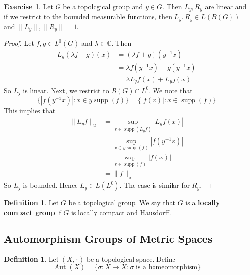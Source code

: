 \documentclass[12pt]{amsart}
\theoremstyle{definition}
\newtheorem{defn}[definition]{Definition}
\newtheorem{ex}[definition]{Exercise}
\newcommand{\lam}{\lambda}
\newcommand{\sig}{\sigma}
\newcommand{\C}{\mathbb{C}}
\newcommand{\tbf}[1]{\textbf{#1}}
\DeclareMathOperator{\supp}{supp}
\DeclareMathOperator{\Aut}{Aut}
\DeclareMathOperator*{\0}{\mbf{0}}
\DeclareMathOperator*{\1}{\mbf{1}}
\newcommand{\lex}[1]{\label{ex:#1}}
\newcommand{\ld}[1]{\label{defn:#1}}
\begin{document}
	\begin{ex} \lex{00000} 
		Let $G$ be a topological group and $y \in G$. Then $L_y, R_y$ are linear and if we restrict to the bounded measurable functions, then  $L_y, R_y \in L(B(G))$ and $\|L_y\|, \|R_y\| = 1$. 
	\end{ex}
	
	\begin{proof}
		Let $f, g \in L^0(G)$ and $\lam \in \C$. Then 
		\begin{align*}
			L_y(\lam f+g)(x)
			& = (\lam f+g)(y^{-1}x) \\
			& = \lam f(y^{-1}x) + g(y^{-1}x) \\
			& = \lam L_yf(x) + L_yg(x)
		\end{align*}
		So $L_y$ is linear. Next, we restrict to $B(G) \cap L^0$. We note that $$\{|f(y^{-1}x)|: x \in y\supp(f)\} = \{|f(x)|: x \in \supp(f)\}$$ This implies that 
		\begin{align*}
			\|L_yf \|_u 
			& = \sup_{x \in \supp(L_yf)} |L_yf(x)| \\
			& = \sup_{x \in y\supp(f)} |f(y^{-1}x)| \\
			& = \sup_{x \in \supp(f)} |f(x)| \\ 
			& = \|f\|_u
		\end{align*} 
		So $L_y$ is bounded. Hence $L_y \in L(L^0)$. The case is similar for $R_y$.
	\end{proof}
	
	\begin{defn} \ld{00000} 
		Let $G$ be a topological group. We say that $G$ is a \tbf{locally compact group} if $G$ is locally compact and Hausdorff.
	\end{defn}
	
	
	
	
	
	
	
	
	
	
	
	
	
	
	
	
	
	
	
	
	
	
	
	
	\newpage
	\subsection{Automorphism Groups of Metric Spaces}
	
	\begin{defn} \ld{}
	Let $(X, \tau)$ be a topological space. Define $$\Aut(X) = \{\sig:X\rightarrow X: \sig \text{ is a homeomorphism} \}$$ 
	\end{defn}	
	
\end{document}
